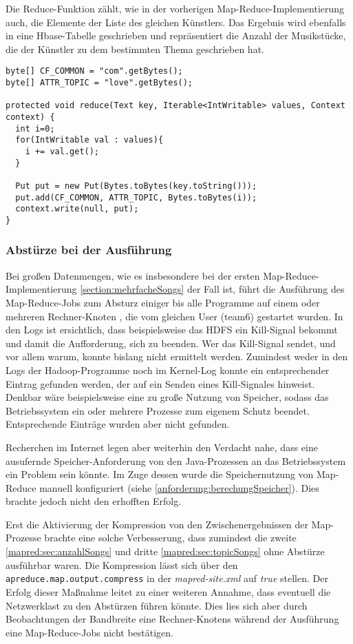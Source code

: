 Die Reduce-Funktion zählt, wie in der vorherigen Map-Reduce-Implementierung auch, die Elemente der Liste des gleichen Künstlers.
Das Ergebnis wird ebenfalls in eine Hbase-Tabelle geschrieben und repräsentiert die Anzahl der Musikstücke, die der
Künstler zu dem bestimmten Thema geschrieben hat.

\begin{lstlisting}[caption={Reduce-Funktion zur Suche nach Musikstücken eines Themas}, label=mapreduce:songsWithTopicSongsReduce]
byte[] CF_COMMON = "com".getBytes();
byte[] ATTR_TOPIC = "love".getBytes();

protected void reduce(Text key, Iterable<IntWritable> values, Context context) {
  int i=0;
  for(IntWritable val : values){
    i += val.get();
  }
            
  Put put = new Put(Bytes.toBytes(key.toString()));
  put.add(CF_COMMON, ATTR_TOPIC, Bytes.toBytes(i));
  context.write(null, put);
}
\end{lstlisting}


\subsubsection{Abstürze bei der Ausführung}
Bei großen Datenmengen, wie es insbesondere bei der ersten Map-Reduce-Implementierung \ref{section:mehrfacheSongs} der Fall ist,
führt die Ausführung des Map-Reduce-Jobs zum Absturz einiger bis alle Programme auf einem oder mehreren Rechner-Knoten
, die vom gleichen User (team6) gestartet wurden.
In den Logs ist ersichtlich, dass beispielsweise das HDFS ein Kill-Signal bekommt und damit die Aufforderung, sich zu beenden.
Wer das Kill-Signal sendet, und vor allem warum, konnte bislang nicht ermittelt werden. Zumindest weder in den Logs der 
Hadoop-Programme noch im Kernel-Log konnte ein entsprechender Eintrag gefunden werden, der auf ein Senden eines
Kill-Signales hinweist. Denkbar wäre beispielsweise eine zu große Nutzung von Speicher, sodass das Betriebssystem ein
oder mehrere Prozesse zum eigenem Schutz beendet. Entsprechende Einträge wurden aber nicht gefunden.

Recherchen im Internet legen aber weiterhin den Verdacht nahe, dass eine ausufernde Speicher-Anforderung von den Java-Prozessen
an das Betriebssystem ein Problem sein könnte. Im Zuge dessen wurde die Speichernutzung von Map-Reduce manuell konfiguriert 
(siehe \ref{anforderung:berechungSpeicher}). Dies brachte jedoch nicht den erhofften Erfolg.

Erst die Aktivierung der Kompression von den Zwischenergebnissen der Map-Prozesse brachte eine solche Verbesserung, dass zumindest
die zweite \ref{mapred:sec:anzahlSongs} und dritte \ref{mapred:sec:topicSongs} ohne Abstürze ausführbar waren. Die Kompression
lässt sich über den \texttt{apreduce.map.output.compress} in der \textit{mapred-site.xml} auf \textit{true} stellen.
Der Erfolg dieser Maßnahme leitet zu einer weiteren Annahme, dass eventuell die Netzwerklast zu den Abstürzen führen
könnte. Dies lies sich aber durch Beobachtungen der Bandbreite eine Rechner-Knotens während der Ausführung
eine Map-Reduce-Jobs nicht bestätigen.
